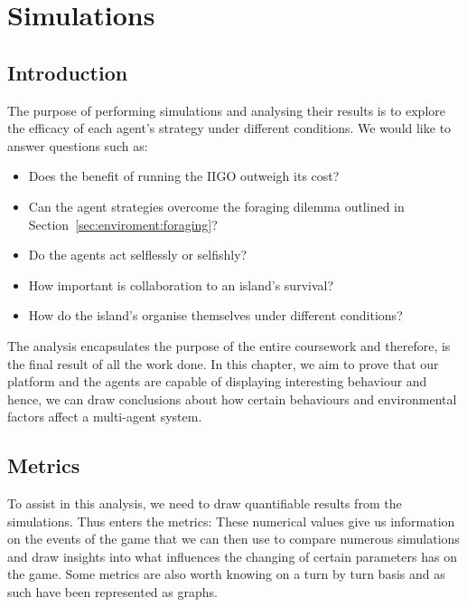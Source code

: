 \chapter{Simulations}
\section{Introduction}
\label{sec:Simulations:Intro}

The purpose of performing simulations and analysing their results is to explore the efficacy of each agent's strategy under different conditions. We would like to answer questions such as: 

\begin{itemize}
    \item Does the benefit of running the IIGO outweigh its cost? 
    \item Can the agent strategies overcome the foraging dilemma outlined in Section~\ref{sec:enviroment:foraging}? 
    \item Do the agents act selflessly or selfishly?
    \item How important is collaboration to an island's survival?
    \item How do the island's organise themselves under different conditions? %
\end{itemize}

The analysis encapsulates the purpose of the entire coursework and therefore, is the final result of all the work done. In this chapter, we aim to prove that our platform and the agents are capable of displaying interesting behaviour and hence, we can draw conclusions about how certain behaviours and environmental factors affect a multi-agent system.

\section{Metrics}
\label{sec:Simulations:Metric}

To assist in this analysis, we need to draw quantifiable results from the simulations. Thus enters the metrics: These numerical values give us information on the events of the game that we can then use to compare numerous simulations and draw insights into what influences the changing of certain parameters has on the game. Some metrics are also worth knowing on a turn by turn basis and as such have been represented as graphs. 



